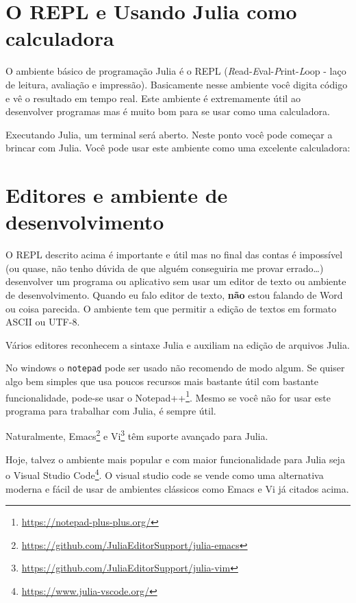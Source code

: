 \documentclass[
  notoc %
]{tufte-book}
\DeclareRobustCommand{\href}[2]{#2\footnote{\url{#1}}}
\newcommand{\passthrough}[1]{#1}
\begin{document}
\hypertarget{sec:repl}{%
\section{O REPL e Usando Julia como calculadora}\label{sec:repl}}

O ambiente básico de programação Julia é o REPL
(\emph{R}ead-\emph{E}val-\emph{P}rint-\emph{L}oop - laço de leitura,
avaliação e impressão). Basicamente nesse ambiente você digita código e
vê o resultado em tempo real. Este ambiente é extremamente útil ao
desenvolver programas mas é muito bom para se usar como uma calculadora.

Executando Julia, um terminal será aberto. Neste ponto você pode começar
a brincar com Julia. Você pode usar este ambiente como uma excelente
calculadora:

\hypertarget{sec:editores}{%
\section{Editores e ambiente de desenvolvimento}\label{sec:editores}}

O REPL descrito acima é importante e útil mas no final das contas é
impossível (ou quase, não tenho dúvida de que alguém conseguiria me
provar errado\ldots) desenvolver um programa ou aplicativo sem usar um
editor de texto ou ambiente de desenvolvimento. Quando eu falo editor de
texto, \textbf{não} estou falando de Word ou coisa parecida. O ambiente
tem que permitir a edição de textos em formato ASCII ou UTF-8.

Vários editores reconhecem a sintaxe Julia e auxiliam na edição de
arquivos Julia.

No windows o \passthrough{\lstinline!notepad!} pode ser usado não
recomendo de modo algum. Se quiser algo bem simples que usa poucos
recursos mais bastante útil com bastante funcionalidade, pode-se usar o
\href{https://notepad-plus-plus.org/}{Notepad++}. Mesmo se você não for
usar este programa para trabalhar com Julia, é sempre útil.

Naturalmente,
\href{https://github.com/JuliaEditorSupport/julia-emacs}{Emacs} e
\href{https://github.com/JuliaEditorSupport/julia-vim}{Vi} têm suporte
avançado para Julia.

Hoje, talvez o ambiente mais popular e com maior funcionalidade para
Julia seja o \href{https://www.julia-vscode.org/}{Visual Studio Code}. O
visual studio code se vende como uma alternativa moderna e fácil de usar
de ambientes clássicos como Emacs e Vi já citados acima.
\end{document}
